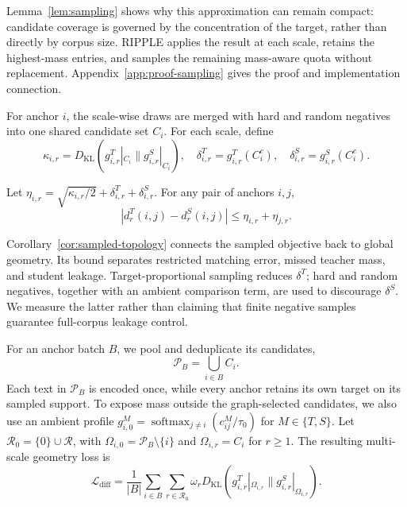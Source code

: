Lemma~\ref{lem:sampling} shows why this approximation can remain compact: candidate coverage is governed by the concentration of the target, rather than directly by corpus size. RIPPLE applies the result at each scale, retains the highest-mass entries, and samples the remaining mass-aware quota without replacement. Appendix~\ref{app:proof-sampling} gives the proof and implementation connection.

For anchor $i$, the scale-wise draws are merged with hard and random negatives into one shared candidate set $C_i$. For each scale, define
\begin{equation}
\kappa_{i,r}
=D_{\mathrm{KL}}(g^T_{i,r}|_{C_i}\|g^S_{i,r}|_{C_i}),
\quad
\delta^T_{i,r}=g^T_{i,r}(C_i^c),
\quad
\delta^S_{i,r}=g^S_{i,r}(C_i^c).
\end{equation}

\begin{corollary}
\label{cor:sampled-topology}
Let
$\eta_{i,r}=\sqrt{\kappa_{i,r}/2}+\delta^T_{i,r}+\delta^S_{i,r}$.
For any pair of anchors $i,j$,
\begin{equation}
\label{eq:sampled-topology-bound}
|d_r^T(i,j)-d_r^S(i,j)|
\leq\eta_{i,r}+\eta_{j,r}.
\end{equation}
\end{corollary}

Corollary~\ref{cor:sampled-topology} connects the sampled objective back to global geometry. Its bound separates restricted matching error, missed teacher mass, and student leakage. Target-proportional sampling reduces $\delta^T$; hard and random negatives, together with an ambient comparison term, are used to discourage $\delta^S$. We measure the latter rather than claiming that finite negative samples guarantee full-corpus leakage control.

For an anchor batch $B$, we pool and deduplicate its candidates,
\begin{equation}
\label{eq:pooled-candidates}
\mathcal P_B=\bigcup_{i\in B}C_i.
\end{equation}
Each text in $\mathcal P_B$ is encoded once, while every anchor retains its own target on its sampled support. To expose mass outside the graph-selected candidates, we also use an ambient profile
$g^M_{i,0}=\operatorname{softmax}_{j\neq i}(c^M_{ij}/\tau_0)$ for $M\in\{T,S\}$.
Let $\mathcal R_0=\{0\}\cup\mathcal R$, with $\Omega_{i,0}=\mathcal P_B\setminus\{i\}$ and $\Omega_{i,r}=C_i$ for $r\geq1$. The resulting multi-scale geometry loss is
\begin{equation}
\label{eq:ldiff}
\mathcal L_{\mathrm{diff}}
=\frac1{|B|}\sum_{i\in B}\sum_{r\in\mathcal R_0}
\omega_rD_{\mathrm{KL}}
\left(g^T_{i,r}|_{\Omega_{i,r}}\|g^S_{i,r}|_{\Omega_{i,r}}\right).
\end{equation}

